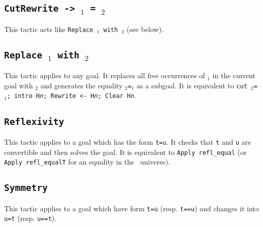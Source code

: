 \subsection{\tt CutRewrite -> \term$_1$ = \term$_2$}
\label{CutRewrite}

This tactic acts like {\tt Replace {\term$_1$} with {\term$_2$}}
(see below).

\subsection{\tt Replace {\term$_1$} with {\term$_2$}}
This tactic applies to any goal. It replaces all free occurrences of
{\term$_1$} in the current goal with {\term$_2$} and generates the
equality {\term$_2$}{\tt =}{\term$_1$} as a subgoal. It is equivalent
to {\tt cut \term$_2$=\term$_1$; intro H{\sl n}; Rewrite <- H{\sl n}; 
  Clear H{\sl n}}.

%  
%

\subsection{\tt Reflexivity}
\label{Reflexivity}
This tactic applies to a goal which has the form {\tt t=u}. It checks
that {\tt t} and {\tt u} are convertible and then solves the goal.
It is equivalent to {\tt Apply refl\_equal} (or {\tt Apply
  refl\_equalT} for an equality in the \Type\ universe).

\begin{ErrMsgs}
\item {}
\item {}
\end{ErrMsgs}

\subsection{\tt Symmetry}
This tactic applies to a goal which have form {\tt t=u}
(resp. \texttt{t==u}) and changes it into {\tt u=t} (resp. \texttt{u==t}).

